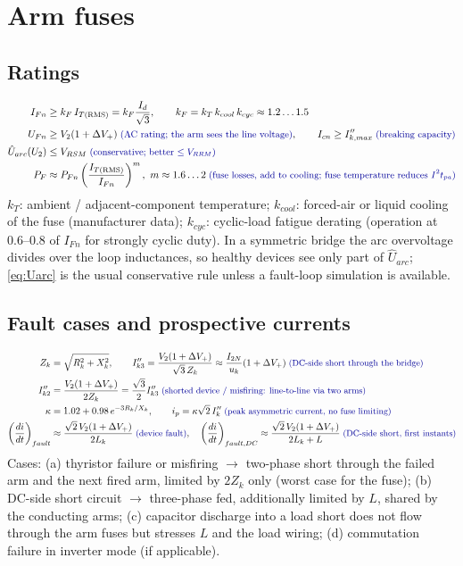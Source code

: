 \documentclass[10pt,a4paper]{scrartcl}
\newcommand{\Id}{I_{d}}
\newcommand{\Vll}{V_{2}}
\newcommand{\Xk}{X_{k}}
\newcommand{\Lk}{L_{k}}
\newcommand{\Rk}{R_{k}}
\newcommand{\uk}{u_{k}}
\newcommand{\ITrms}{I_{T\mathrm{(RMS)}}}
\newcommand{\VRRM}{V_{RRM}}
\newcommand{\VRSM}{V_{RSM}}
\newcommand{\iit}{I^{2}t}
\newcommand{\rt}[1]{\text{\small\color{blue!60!black} #1}}
\begin{document}
\section{Arm fuses}\label{sec:fuses}
\subsection{Ratings}
\begin{align}
I_{Fn} &\ge k_F\,\ITrms = k_F\frac{\Id}{\sqrt3}, \qquad
k_F = k_T\,k_{cool}\,k_{cyc} \approx 1.2\ldots1.5 \label{eq:IFn}\\
U_{Fn} &\ge \Vll(1+\Delta V_+) \;\rt{(AC rating; the arm sees the line voltage)}, \qquad
I_{cn} \ge I''_{k,max} \;\rt{(breaking capacity)} \label{eq:UFn}\\
\hat U_{arc}(U_2) &\le \VRSM \;\rt{(conservative; better $\le\VRRM$)} \label{eq:Uarc}\\
P_F &\approx P_{Fn}\left(\frac{\ITrms}{I_{Fn}}\right)^{m},\ m\approx1.6\ldots2 \;\rt{(fuse losses, add to cooling; fuse temperature reduces $\iit_{pa}$)} \label{eq:PF}
\end{align}
$k_T$: ambient / adjacent-component temperature; $k_{cool}$: forced-air or liquid cooling of the fuse (manufacturer data); $k_{cyc}$: cyclic-load fatigue derating (operation at 0.6--0.8 of $I_{Fn}$ for strongly cyclic duty). In a symmetric bridge the arc overvoltage divides over the loop inductances, so healthy devices see only part of $\hat U_{arc}$; \eqref{eq:Uarc} is the usual conservative rule unless a fault-loop simulation is available.

\subsection{Fault cases and prospective currents}\label{sec:faults}
\begin{align}
Z_k &= \sqrt{\Rk^2 + \Xk^2}, \qquad
I''_{k3} = \frac{\Vll(1+\Delta V_+)}{\sqrt3\,Z_k} \approx \frac{I_{2N}}{\uk}(1+\Delta V_+) \;\rt{(DC-side short through the bridge)} \label{eq:Ik3}\\
I''_{k2} &= \frac{\Vll(1+\Delta V_+)}{2Z_k} = \frac{\sqrt3}{2}I''_{k3} \;\rt{(shorted device / misfiring: line-to-line via two arms)} \label{eq:Ik2}\\
\kappa &= 1.02 + 0.98\,e^{-3\Rk/\Xk}, \qquad
i_p = \kappa\sqrt2\,I''_k \;\rt{(peak asymmetric current, no fuse limiting)} \label{eq:ip}\\
\left(\frac{di}{dt}\right)_{fault} &\approx \frac{\sqrt2\,\Vll(1+\Delta V_+)}{2\Lk} \;\rt{(device fault)}, \quad
\left(\frac{di}{dt}\right)_{fault,DC} \approx \frac{\sqrt2\,\Vll(1+\Delta V_+)}{2\Lk + L} \;\rt{(DC-side short, first instants)} \label{eq:didtf}
\end{align}
Cases: (a) thyristor failure or misfiring $\to$ two-phase short through the failed arm and the next fired arm, limited by $2Z_k$ only (worst case for the fuse); (b) DC-side short circuit $\to$ three-phase fed, additionally limited by $L$, shared by the conducting arms; (c) capacitor discharge into a load short does not flow through the arm fuses but stresses $L$ and the load wiring; (d) commutation failure in inverter mode (if applicable).
\end{document}
